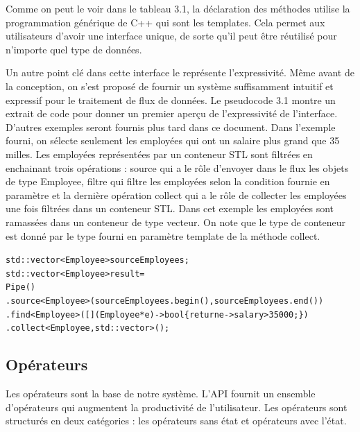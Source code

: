 Comme on peut le voir dans le tableau 3.1, la d\'eclaration des m\'ethodes utilise la programmation g\'en\'erique de C++ qui sont les templates. Cela permet aux utilisateurs d'avoir une interface unique, de sorte qu'il peut \^etre r\'eutilis\'e pour n'importe quel type de donn\'ees.


Un autre point cl\'e dans cette interface le repr\'esente l'expressivit\'e. M\^eme avant de la conception, on s'est propos\'e de fournir un syst\`eme suffisamment intuitif et expressif pour le traitement de flux de donn\'ees. Le pseudocode 3.1 montre un extrait de code pour donner un premier aper\c{c}u de l'expressivit\'e de l'interface. D'autres exemples seront fournis plus tard dans ce document. Dans l'exemple fourni, on s\'electe seulement les employ\'ees qui ont un salaire plus grand que 35 milles. Les employ\'ees repr\'esent\'ees par un conteneur STL sont filtr\'ees en enchainant trois op\'erations : source qui a le r\^ole d'envoyer dans le flux les objets de type Employee, filtre qui filtre les employ\'ees selon la condition fournie en param\`etre et la derni\`ere op\'eration collect qui a le r\^ole de collecter les employ\'ees une fois filtr\'ees dans un conteneur STL. Dans cet exemple les employ\'ees sont ramass\'ees dans un conteneur de type vecteur. On note que le type de conteneur est donn\'e par le type fourni en param\`etre template de la m\'ethode collect.


\begin{pseudocode}
{\samepage\small
\begin{alltt}
std::vector<Employee> sourceEmployees;    
std::vector<Employee> result = 
        Pipe()
        .source<Employee>(sourceEmployees.begin(), sourceEmployees.end())
        .find<Employee>([](Employee *e) ->bool \{return e->salary > 35000;\})
        .collect<Employee, std::vector>();

\end{alltt}
}
\caption{L\'expressivit\'e de l'API.}
\label{expressivite_api.pseudo}
\end{pseudocode}




\subsection{Op\'erateurs}

Les op\'erateurs sont la base de notre syst\`eme. L'API fournit un ensemble d'op\'erateurs qui augmentent la productivit\'e de l'utilisateur. Les op\'erateurs sont structur\'es en deux cat\'egories : les op\'erateurs sans \'etat et op\'erateurs avec l'\'etat.

